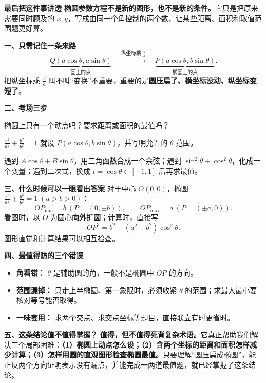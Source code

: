 \begin{summarybox}
\textbf{\textcolor{CSummary}{最后把这件事讲透}}
\textbf{椭圆参数方程不是新的图形，也不是新的条件。}它只是把原来需要同时顾及的 $x,y$，写成由同一个角控制的两个数，让某些距离、面积和取值范围题更好算。

\medskip
\textbf{\textcolor{CSummary}{一、只需记住一条来路}}
\[
\underbrace{Q(a\cos\theta,a\sin\theta)}_{\text{圆上的点}}
\quad\xrightarrow{\text{纵坐标乘 }\frac ba}\quad
\underbrace{P(a\cos\theta,b\sin\theta)}_{\text{椭圆上的点}}.
\]
把纵坐标乘 $\frac ba$ 叫不叫“变换”不重要，重要的是\textbf{圆压扁了、横坐标没动、纵坐标变短了}。

\medskip
\textbf{\textcolor{CSummary}{二、考场三步}}
\begin{description}[style=nextline,leftmargin=2.8em,labelsep=0.5em,itemsep=0.42em]
\item[\textbf{看题：}] 椭圆上只有一个动点吗？要求距离或面积的最值吗？
\item[\textbf{设点：}] $\frac{x^2}{a^2}+\frac{y^2}{b^2}=1$ 就设 $P(a\cos\theta,b\sin\theta)$，并写明允许的 $\theta$ 范围。
\item[\textbf{化简：}] 遇到 $A\cos\theta+B\sin\theta$，用三角函数合成一个余弦；遇到 $\sin^2\theta+\cos^2\theta$，化成一个变量；遇到二次式，换成 $t=\cos\theta\in[-1,1]$ 后再求最值。
\end{description}

\medskip
\textbf{\textcolor{CSummary}{三、什么时候可以一眼看出答案}}
对于中心 $O(0,0)$，椭圆 $\frac{x^2}{a^2}+\frac{y^2}{b^2}=1\;(a>b>0)$：
\[
\boxed{OP_{\min}=b\ (P=(0,\pm b)),\qquad
OP_{\max}=a\ (P=(\pm a,0)).}
\]
看图时，以 $O$ 为圆心\textbf{向外扩圆}；计算时，直接写
\[
OP^2=b^2+(a^2-b^2)\cos^2\theta.
\]
图形直觉和计算结果可以相互检查。

\tcbbreak
\textbf{\textcolor{CSummary}{四、最值得防的三个错误}}
\begin{itemize}[leftmargin=*,itemsep=0.35em,topsep=0.4em]
\item \textbf{角看错：} $\theta$ 是辅助圆的角，一般不是椭圆中 $OP$ 的方向。
\item \textbf{范围漏掉：} 只走上半椭圆、第一象限时，必须收紧 $\theta$ 的范围；求最大最小要核对等号能否取得。
\item \textbf{一味套用：} 求两个交点、求交点坐标等题目，直接联立有时更省时。
\end{itemize}

\medskip
\textbf{\textcolor{CSummary}{五、这条结论值不值得掌握？}}
\textbf{值得，但不值得死背复杂术语。}它真正帮助我们解决三个局部困难：\textbf{（1）椭圆上动点怎么设；（2）含两个坐标的距离和面积怎样减少计算；（3）怎样用圆的直观图形检查椭圆最值。}只要理解“圆压扁成椭圆”，能正反两个方向证明表示没有漏点，并能完成一两道最值题，就已经掌握了这条结论。
\end{summarybox}

